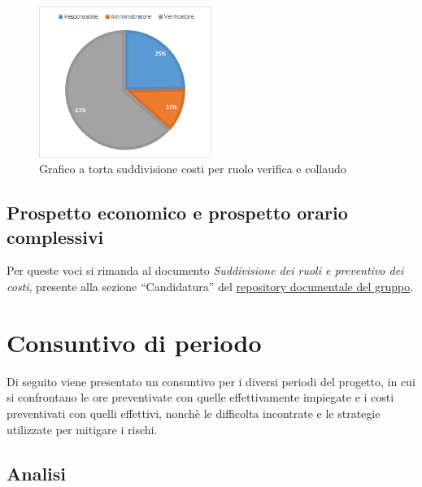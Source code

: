 \begin{figure}[H]
    \centering
    \includegraphics[width=0.5\textwidth]{images/torta_collaudo.png}
    \caption{Grafico a torta suddivisione costi per ruolo verifica e collaudo}
    \label{fig:torta_collaudo}
\end{figure}

\subsection{Prospetto economico e prospetto orario complessivi}\label{sec:preventivo:totale}
Per queste voci si rimanda al documento \textit{Suddivisione dei ruoli e preventivo dei  costi}, presente alla sezione ``Candidatura'' del \href{https://avant-garde-software-engineering.github.io/documentazione.html}{repository documentale del gruppo}.



\newpage
\section{Consuntivo di periodo}\label{sec:consuntivo}

Di seguito viene presentato un consuntivo per i diversi periodi del progetto, in cui si confrontano le ore preventivate con quelle effettivamente impiegate e i costi preventivati con quelli effettivi, nonchè le difficolta incontrate e le strategie utilizzate per mitigare i rischi.\\

\subsection{Analisi}\label{sec:consuntivo:analisi}

